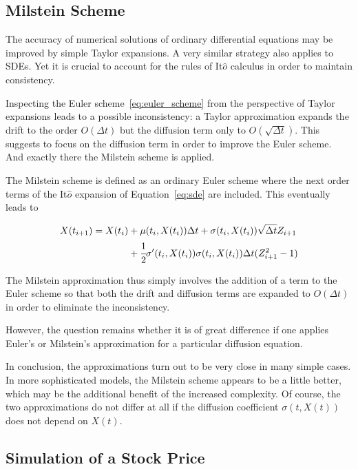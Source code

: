 \begin{attention}
\subsection{Milstein Scheme}
The accuracy of numerical solutions of ordinary differential equations may be improved by simple Taylor expansions. A very similar strategy also applies to SDEs. Yet it is crucial to account for the rules of It$\hat{o}$ calculus in order to maintain consistency.

Inspecting the Euler scheme~\ref{eq:euler_scheme} from the perspective of Taylor expansions leads to a possible inconsistency: a Taylor approximation expands the drift to the order $O(\Delta t)$ but the diffusion term only to $O(\sqrt{\Delta t})$. This suggests to focus on the diffusion term in order to improve the Euler scheme. And exactly there the Milstein scheme is applied.

The Milstein scheme is defined as an ordinary Euler scheme where the next order terms of the It$\hat{o}$ expansion of Equation~\ref{eq:sde} are included. This eventually leads to

\begin{equation}
\begin{aligned}
X(t_{i+1})= X(t_i) &+ \mu(t_i, X(t_i))\Delta t+\sigma(t_i,X(t_i))\sqrt{\Delta t}Z_{i+1} \\
&+\cfrac{1}{2}\sigma'(t_i ,X(t_i))\sigma (t_i ,X(t_i))\Delta t(Z^2_{i+1} -1)
\end{aligned}
\end{equation}

The Milstein approximation thus simply involves the addition of a term to the Euler scheme so that both the drift and diffusion terms are expanded to $O(\Delta t)$ in order to eliminate the inconsistency. 

However, the question remains whether it is of great difference if one applies Euler’s or Milstein’s approximation for a particular diffusion equation. 

In conclusion, the approximations turn out to be very close in many simple cases. In more sophisticated models, the Milstein scheme appears to be a little better, which may be the additional benefit of the increased complexity. Of course, the two approximations do not differ at all if the diffusion coefficient $\sigma (t,X(t))$ does not depend on $X(t)$.
\end{attention}

\subsection{Simulation of a Stock Price}

